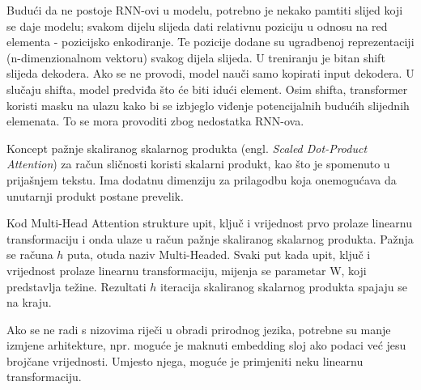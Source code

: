 	Budući da ne postoje RNN-ovi u modelu, potrebno je nekako pamtiti slijed koji se daje modelu; svakom dijelu slijeda dati relativnu poziciju u odnosu na red elementa - pozicijsko enkodiranje. Te pozicije dodane su ugradbenoj reprezentaciji (n-dimenzionalnom vektoru) svakog dijela slijeda. U treniranju je bitan shift slijeda dekodera. Ako se ne provodi, model nauči samo kopirati input dekodera. U slučaju shifta, model predviđa što će biti idući element. Osim shifta, transformer koristi masku na ulazu kako bi se izbjeglo viđenje potencijalnih budućih slijednih elemenata. To se mora provoditi zbog nedostatka RNN-ova.

	Koncept pažnje skaliranog skalarnog produkta (engl. \textit{Scaled Dot-Product Attention}) za račun sličnosti koristi skalarni produkt, kao što je spomenuto u prijašnjem tekstu. Ima dodatnu dimenziju za prilagodbu koja onemogućava da unutarnji produkt postane prevelik.

	Kod Multi-Head Attention strukture upit, ključ i vrijednost prvo prolaze linearnu transformaciju i onda ulaze u račun pažnje skaliranog skalarnog produkta. Pažnja se računa $h$ puta, otuda naziv Multi-Headed.  Svaki put kada upit, ključ i vrijednost prolaze linearnu transformaciju, mijenja se parametar W, koji predstavlja težine. Rezultati $h$ iteracija skaliranog skalarnog produkta spajaju se na kraju.

	Ako se ne radi s nizovima riječi u obradi prirodnog jezika, potrebne su manje izmjene arhitekture, npr. moguće je maknuti embedding sloj ako podaci već jesu brojčane vrijednosti. Umjesto njega, moguće je primjeniti neku linearnu transformaciju.

